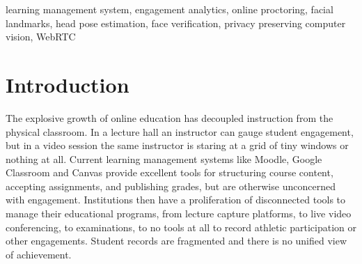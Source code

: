 \documentclass[conference]{IEEEtran}
\begin{document}
\maketitle

\begin{abstract}
Online learning platforms provide course delivery but offer little insight into student engagement, and commercial proctoring services seek to address this by transmitting student video to remote servers with potentially compromising privacy. This paper presents SmartLMS, a learning management system in which computer vision processing occurs in student browsers, only transmitting derived scalar measurements out of band to servers. The system uses a facial landmark model, extracting four hundred and seventy eight three dimensional landmarks, a facial transformation matrix from which head orientation is trivially solved, and blendshape coefficients from which eye gaze is computed independently from head motion. A separate embedding network produces a one hundred and twenty eight dimensional face descriptor for verifying the student taking an examination. The platform consolidates course management, peer to peer virtual classrooms, assignments, attendance, and achievement records into a cohesive whole, with a design philosophy that an unmetered quantity should be reported as such rather than implicitly replaced, making failures in measurement obvious to both student and instructor. An evaluation considers identity verification error rates, attention state classification using a subject held out protocol, and head pose against ground truth.
\end{abstract}

\begin{IEEEkeywords}
learning management system, engagement analytics, online proctoring, facial landmarks, head pose estimation, face verification, privacy preserving computer vision, WebRTC
\end{IEEEkeywords}

\section{Introduction}

The explosive growth of online education has decoupled instruction from the
physical classroom. In a lecture hall an instructor can gauge student
engagement, but in a video session the same instructor is staring at a
grid of tiny windows or nothing at all. Current learning management
systems like Moodle, Google Classroom and Canvas provide excellent
tools for structuring course content, accepting assignments, and
publishing grades, but are otherwise unconcerned with engagement.
Institutions then have a proliferation of disconnected tools to manage
their educational programs, from lecture capture platforms, to live
video conferencing, to examinations, to no tools at all to record
athletic participation or other engagements. Student records are
fragmented and there is no unified view of achievement.
\end{document}

